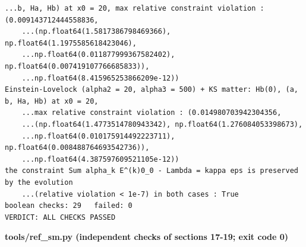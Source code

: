 \documentclass[10pt,a4paper]{article}
\begin{document}
\begin{Verbatim}[fontsize=\small,frame=single,framesep=2mm]
    ...b, Ha, Hb) at x0 = 20, max relative constraint violation : (0.009143712444558836,
    ...(np.float64(1.5817386798469366), np.float64(1.1975585618423046),
    ...np.float64(0.011877999367582402), np.float64(0.007419107766685833)),
    ...np.float64(8.415965253866209e-12))
Einstein-Lovelock (alpha2 = 20, alpha3 = 500) + KS matter: Hb(0), (a, b, Ha, Hb) at x0 = 20,
    ...max relative constraint violation : (0.014980703942304356,
    ...(np.float64(1.4773514780943342), np.float64(1.276084053398673),
    ...np.float64(0.010175914492223711), np.float64(0.008488764693542736)),
    ...np.float64(4.387597609521105e-12))
the constraint Sum alpha_k E^(k)0_0 - Lambda = kappa eps is preserved by the evolution
    ...(relative violation < 1e-7) in both cases : True
boolean checks: 29   failed: 0
VERDICT: ALL CHECKS PASSED
\end{Verbatim}
\textbf{tools/ref\_sm.py (independent checks of sections 17-19; exit code 0)}
\end{document}
